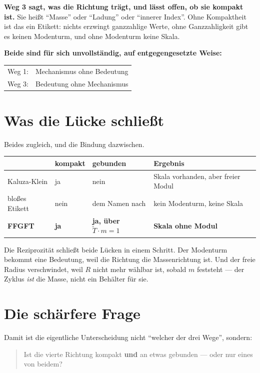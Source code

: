 \textbf{Weg 3 sagt, was die Richtung trägt, und lässt offen, ob sie
kompakt ist.} Sie heißt \enquote{Masse} oder \enquote{Ladung} oder
\enquote{innerer Index}. Ohne Kompaktheit ist das ein Etikett: nichts
erzwingt ganzzahlige Werte, ohne Ganzzahligkeit gibt es keinen
Modenturm, und ohne Modenturm keine Skala.

\textbf{Beide sind für sich unvollständig, auf entgegengesetzte
Weise:}
\begin{center}
\begin{tabular}{ll}
Weg 1: & Mechanismus ohne Bedeutung \\
Weg 3: & Bedeutung ohne Mechanismus \\
\end{tabular}
\end{center}

\section{Was die Lücke schließt}

Beides zugleich, und die Bindung dazwischen.

\begin{center}
\begin{tabular}{lllp{4.6cm}}
\toprule
 & kompakt & gebunden & Ergebnis \\
\midrule
Kaluza-Klein & ja & nein & Skala vorhanden, aber freier Modul \\
bloßes Etikett & nein & dem Namen nach & kein Modenturm, keine Skala \\
\textbf{FFGFT} & \textbf{ja} & \textbf{ja, über $\tilde T \cdot m = 1$}
  & \textbf{Skala ohne Modul} \\
\bottomrule
\end{tabular}
\end{center}

Die Reziprozität schließt beide Lücken in einem Schritt. Der Modenturm
bekommt eine Bedeutung, weil die Richtung die Massenrichtung ist. Und
der freie Radius verschwindet, weil $R$ nicht mehr wählbar ist, sobald
$m$ feststeht --- der Zyklus \emph{ist} die Masse, nicht ein Behälter
für sie.

\section{Die schärfere Frage}

Damit ist die eigentliche Unterscheidung nicht \enquote{welcher der
drei Wege}, sondern:

\begin{quote}
Ist die vierte Richtung kompakt \textbf{und} an etwas gebunden --- oder
nur eines von beidem?
\end{quote}

